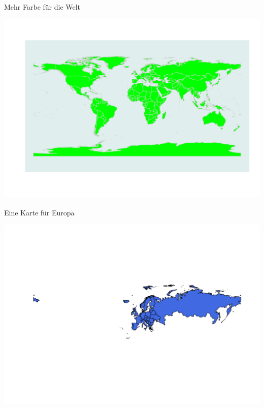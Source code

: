 \documentclass[ignorenonframetext,]{beamer}
\begin{document}
\begin{frame}{Mehr Farbe für die Welt}

\includegraphics{Geomedizin_files/figure-beamer/unnamed-chunk-95-1.pdf}

\end{frame}

\begin{frame}{Eine Karte für Europa}

\includegraphics{Geomedizin_files/figure-beamer/unnamed-chunk-96-1.pdf}

\end{frame}
\end{document}

